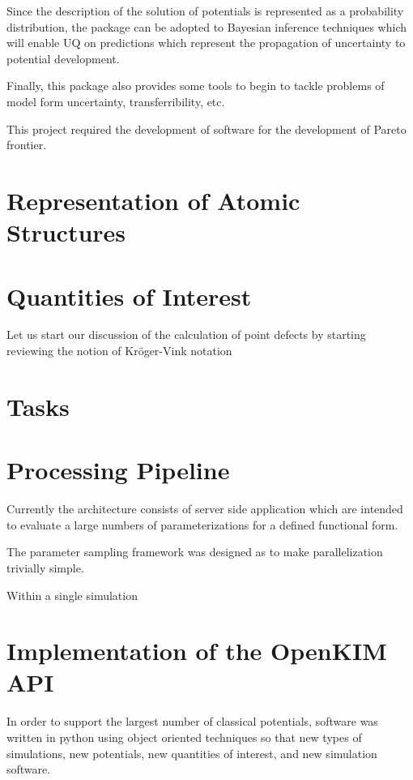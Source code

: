 Since the description of the solution of potentials is represented as a probability distribution, the package can be adopted to Bayesian inference techniques which will enable UQ on predictions which represent the propagation of uncertainty to potential development.

Finally, this package also provides some tools to begin to tackle problems of model form uncertainty, transferribility, etc.

This project required the development of software for the development of Pareto frontier.

\section{Representation of Atomic Structures}


\section{Quantities of Interest}

Let us start our discussion of the calculation of point defects by starting reviewing the notion of Kr\"oger-Vink notation\cite{kroger1956_notation}

\section{Tasks}

\section{Processing Pipeline}
Currently the architecture consists of server side application which are intended to evaluate a large numbers of parameterizations for a defined functional form.

The parameter sampling framework was designed as to make parallelization trivially simple.

Within a single simulation

\section{Implementation of the OpenKIM API}

In order to support the largest number of classical potentials, software was written in python using object oriented techniques so that new types of simulations, new potentials, new quantities of interest, and new simulation software.

